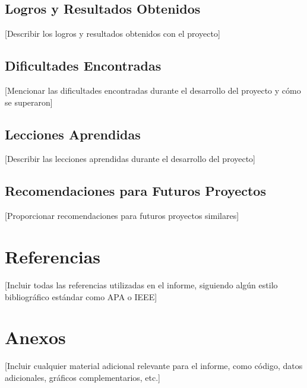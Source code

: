 \documentclass[12pt,letterpaper]{report}
\begin{document}
\section{Logros y Resultados Obtenidos}
[Describir los logros y resultados obtenidos con el proyecto]

\section{Dificultades Encontradas}
[Mencionar las dificultades encontradas durante el desarrollo del proyecto y cómo se superaron]

\section{Lecciones Aprendidas}
[Describir las lecciones aprendidas durante el desarrollo del proyecto]

\section{Recomendaciones para Futuros Proyectos}
[Proporcionar recomendaciones para futuros proyectos similares]

\chapter*{Referencias}

[Incluir todas las referencias utilizadas en el informe, siguiendo algún estilo bibliográfico estándar como APA o IEEE]

\chapter*{Anexos}

[Incluir cualquier material adicional relevante para el informe, como código, datos adicionales, gráficos complementarios, etc.]
\end{document}
